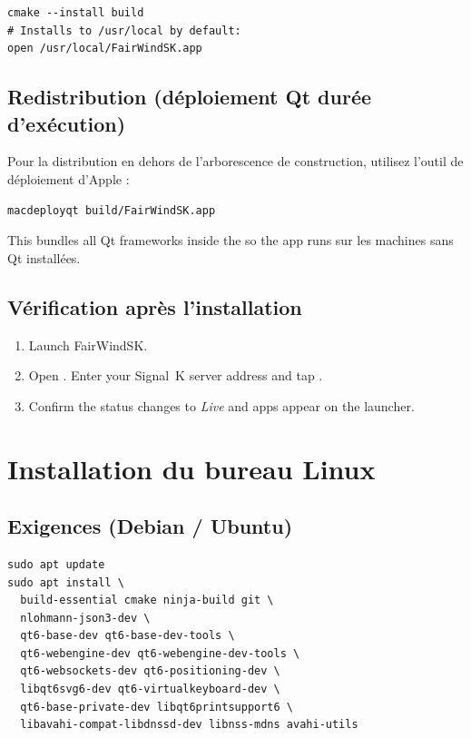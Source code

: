 \begin{lstlisting}
cmake --install build
# Installs to /usr/local by default:
open /usr/local/FairWindSK.app
\end{lstlisting}

\subsection{Redistribution (déploiement Qt durée d'exécution)}

Pour la distribution en dehors de l'arborescence de construction, utilisez l'outil de déploiement d'Apple :

\begin{lstlisting}
macdeployqt build/FairWindSK.app
\end{lstlisting}

This bundles all Qt frameworks inside the  so the app runs
sur les machines sans Qt installées.

\subsection{Vérification après l'installation}

\begin{enumerate}
  \item Launch FairWindSK.
  \item Open .
        Enter your Signal~K server address and tap .
  \item Confirm the status changes to \textit{Live} and apps appear on the launcher.
\end{enumerate}

\section{Installation du bureau Linux}
\label{app:linux}

\subsection{Exigences (Debian / Ubuntu)}

\begin{lstlisting}
sudo apt update
sudo apt install \
  build-essential cmake ninja-build git \
  nlohmann-json3-dev \
  qt6-base-dev qt6-base-dev-tools \
  qt6-webengine-dev qt6-webengine-dev-tools \
  qt6-websockets-dev qt6-positioning-dev \
  libqt6svg6-dev qt6-virtualkeyboard-dev \
  qt6-base-private-dev libqt6printsupport6 \
  libavahi-compat-libdnssd-dev libnss-mdns avahi-utils
\end{lstlisting}

